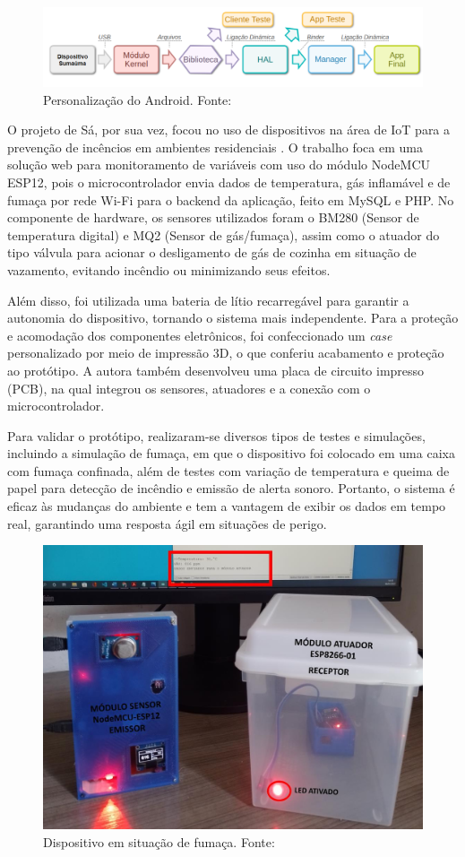 \begin{figure}[ht]
    \centering
    \includegraphics[width=.87\textwidth]{img/smartlamp-overview.png}
    \caption{Personalização do Android. Fonte:\cite{ufam-aosp-sumama}}\label{figSumauma}
\end{figure}

O projeto de Sá, por sua vez, focou no uso de dispositivos na área de IoT para a prevenção de incêncios em ambientes residenciais \cite{uea-iot-deteccao-incendio}. O trabalho 
foca em uma solução web para monitoramento de variáveis com uso do módulo NodeMCU ESP12, pois o microcontrolador envia dados de temperatura, gás inflamável e de 
fumaça por rede Wi-Fi para o backend da aplicação, feito em MySQL e PHP. No componente de hardware, os sensores utilizados foram o BM280 (Sensor de temperatura digital) e MQ2 (Sensor de gás/fumaça), assim como 
o atuador do tipo válvula para acionar o desligamento de gás de cozinha em situação de vazamento, evitando incêndio ou minimizando seus efeitos. 

Além disso, foi utilizada uma bateria de lítio recarregável para garantir a autonomia do dispositivo, tornando o sistema mais independente. Para a proteção e acomodação dos componentes eletrônicos, foi 
confeccionado um \textit{case} personalizado por meio de impressão 3D, o que conferiu acabamento e proteção ao protótipo. A autora também desenvolveu uma placa de circuito impresso (PCB), na qual integrou os sensores, atuadores e
a conexão com o microcontrolador.

Para validar o protótipo, realizaram-se diversos tipos de testes e simulações, incluindo a simulação de fumaça, em que o dispositivo foi colocado em uma caixa com 
fumaça confinada, além de testes com variação de temperatura e queima de papel para detecção de incêndio e emissão de alerta sonoro. Portanto, o sistema é eficaz às mudanças do ambiente e 
tem a vantagem de exibir os dados em tempo real, garantindo uma resposta ágil em situações de perigo. 

\begin{figure}[ht]
    \centering
    \includegraphics[width=.44\textwidth]{img/sa-dispositivo-simulacao.png}
    \caption{Dispositivo em situação de fumaça. Fonte:\cite{uea-iot-deteccao-incendio}}\label{figProtitpoUEA}
\end{figure}

